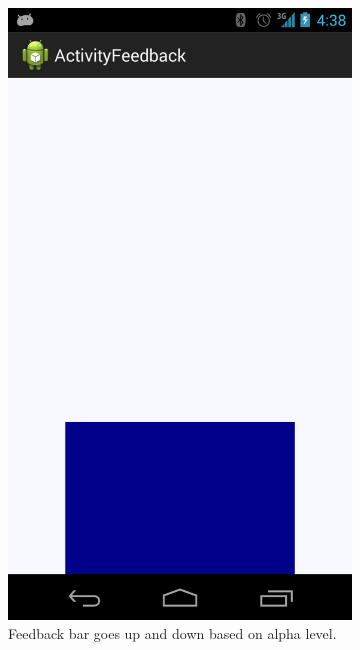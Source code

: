 \documentclass[a4paper,10pt,english,lof,lot,twoside]{puthesis}
\begin{document}
\begin{figure}
\begin{subfigure}[t]{0.30\linewidth}
\includegraphics[width=0.800\linewidth]{early-prototype-feedback-bar.png}
\caption[Feedback bar]{Feedback bar goes up and down based on alpha level.}\label{ch-design/index:fig-early-prototype-feedback-bar}\end{subfigure}
\begin{subfigure}[t]{0.30\linewidth}
\centering
\capstart


\end{subfigure}
\end{figure}
\end{document}

